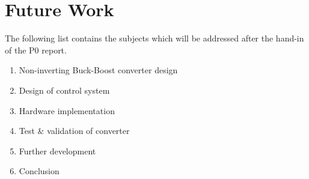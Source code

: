 \chapter{Future Work}
The following list contains the subjects which will be addressed after the hand-in of the P0 report.

\begin{enumerate}
	\item Non-inverting Buck-Boost converter design
	\item Design of control system
	\item Hardware implementation
	\item Test \& validation of converter
	\item Further development
	\item Conclusion	
\end{enumerate}
